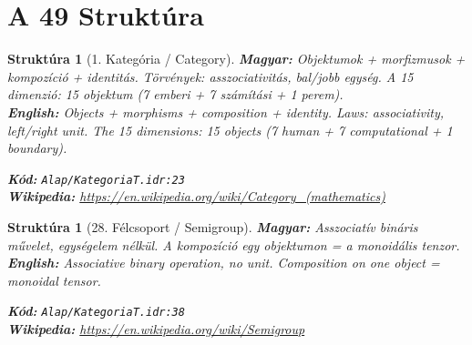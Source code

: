 \documentclass[11pt,a4paper,twocolumn]{article}
\newtheorem{struktura}[tetel]{Struktúra}
\begin{document}
\section{A 49 Struktúra}\n\onecolumn\n\begin{struktura}[1. Kategória / Category]

\textbf{Magyar:} Objektumok + morfizmusok + kompozíció + identitás. Törvények: asszociativitás, bal/jobb egység. A 15 dimenzió: 15 objektum (7 emberi + 7 számítási + 1 perem).\\

\textbf{English:} Objects + morphisms + composition + identity. Laws: associativity, left/right unit. The 15 dimensions: 15 objects (7 human + 7 computational + 1 boundary).\\

\begin{center}
\end{center}

\textbf{Kód:} \texttt{Alap/KategoriaT.idr:23}\\
\textbf{Wikipedia:} \url{https://en.wikipedia.org/wiki/Category_(mathematics)}

\end{struktura}

\vspace{0.5cm}

\begin{struktura}[28. Félcsoport / Semigroup]

\textbf{Magyar:} Asszociatív bináris művelet, egységelem nélkül. A kompozíció egy objektumon = a monoidális tenzor.\\

\textbf{English:} Associative binary operation, no unit. Composition on one object = monoidal tensor.\\

\begin{center}
\end{center}

\textbf{Kód:} \texttt{Alap/KategoriaT.idr:38}\\
\textbf{Wikipedia:} \url{https://en.wikipedia.org/wiki/Semigroup}

\end{struktura}
\end{document}

